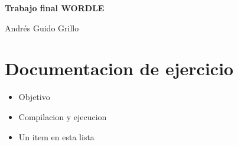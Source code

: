 \documentclass[oneside]{article}
\begin{document}
	\begin{titlepage}
		\vspace*{\fill}		
		\centering
		{\huge \bfseries Trabajo final WORDLE\par}
		\vspace{1cm}
		{\large Andrés Guido Grillo\par}		
		\vfill
	\end{titlepage}
	
	\section*{Documentacion de ejercicio}
	\begin{itemize}
		\item Objetivo
		\item Compilacion y ejecucion
		\item Un item en esta lista
	\end{itemize}
		
		
	\newpage
	\thispagestyle{fancy}	
	
\end{document}
